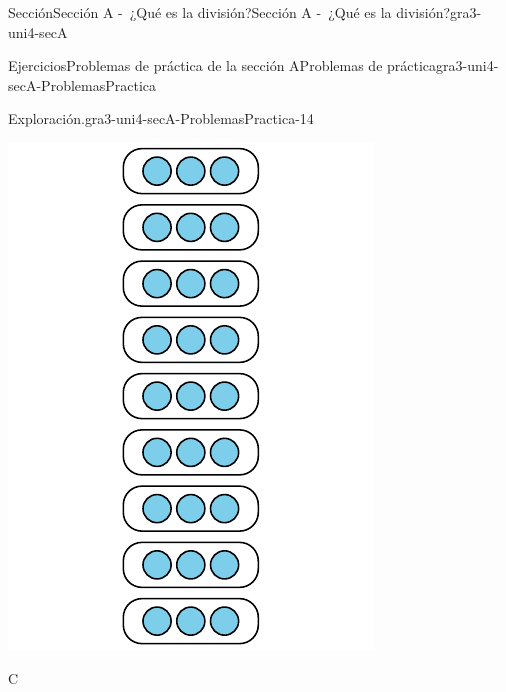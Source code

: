 \documentclass[twoside,10pt,]{article}
\begin{document}
\begin{sectionptx}{Sección}{Sección A -~¿Qué es la división?}{}{Sección A -~¿Qué es la división?}{}{}{gra3-uni4-secA}
\begin{exercises-subsection}{Ejercicios}{Problemas de práctica de la sección A}{}{Problemas de práctica}{}{}{gra3-uni4-secA-ProblemasPractica}
\begin{divisionexercise}{12}{Exploración.}{}{gra3-uni4-secA-ProblemasPractica-14}
\begin{sidebyside}{6}{0.00333333333333333}{0.00333333333333333}{0.00666666666666667}
\begin{sbspanel}{0.3}
\includegraphics[width=\linewidth]{external/svg-source/tikz-file-151675.pdf}
\end{sbspanel}%
\begin{sbspanel}{0.02}%
C%
\end{sbspanel}%
\begin{sbspanel}{0.3}%

\end{sbspanel}
\end{sidebyside}
\end{divisionexercise}
\end{exercises-subsection}
\end{sectionptx}
\end{document}
